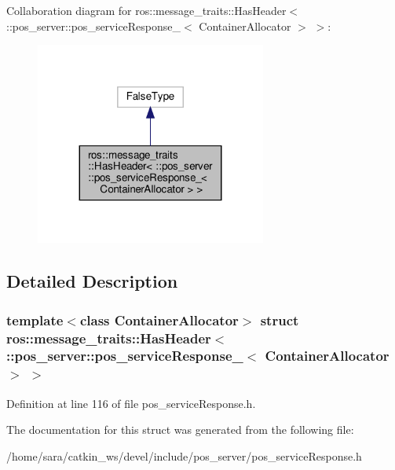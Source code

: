 Collaboration diagram for ros\+:\+:message\+\_\+traits\+:\+:Has\+Header$<$ \+:\+:pos\+\_\+server\+:\+:pos\+\_\+service\+Response\+\_\+$<$ Container\+Allocator $>$ $>$\+:
\nopagebreak
\begin{figure}[H]
\begin{center}
\leavevmode
\includegraphics[width=215pt]{structros_1_1message__traits_1_1HasHeader_3_01_1_1pos__server_1_1pos__serviceResponse___3_01Cont3cedd49beda1d29d6432fe4d379e8caf}
\end{center}
\end{figure}


\subsection{Detailed Description}
\subsubsection*{template$<$class Container\+Allocator$>$\newline
struct ros\+::message\+\_\+traits\+::\+Has\+Header$<$ \+::pos\+\_\+server\+::pos\+\_\+service\+Response\+\_\+$<$ Container\+Allocator $>$ $>$}



Definition at line 116 of file pos\+\_\+service\+Response.\+h.



The documentation for this struct was generated from the following file\+:\begin{DoxyCompactItemize}
\item 
/home/sara/catkin\+\_\+ws/devel/include/pos\+\_\+server/pos\+\_\+service\+Response.\+h\end{DoxyCompactItemize}
